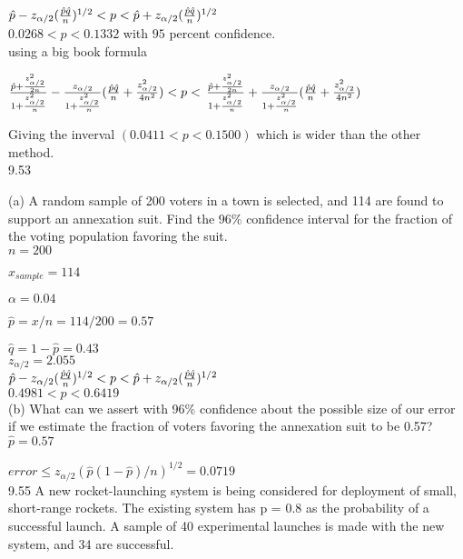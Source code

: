 $\hat{p} - z_{\alpha/2} (\frac{ \hat{p} \hat{q} }{n})^{1/2} < p < \hat{p} + z_{\alpha/2} (\frac{ \hat{p} \hat{q} }{n})^{1/2} $ \\

$0.0268 < p < 0.1332$ with $95$ percent confidence. \\

using a big book formula

$\frac{\hat{p} + \frac{z^2_{\alpha/2}}{2n}}{1  + \frac{z^2_{\alpha/2}}{n}} - \frac{z_{\alpha/2} }{1+ \frac{z_{\alpha/2}^2}{n}}
(\frac{\hat{p}\hat{q}}{n} + \frac{z^2_{\alpha/2}}{4n^2}) <
p < $
$\frac{\hat{p} + \frac{z^2_{\alpha/2}}{2n}}{1  + \frac{z^2_{\alpha/2}}{n}} + \frac{z_{\alpha/2} }{1+ \frac{z_{\alpha/2}^2}{n}}
(\frac{\hat{p}\hat{q}}{n} + \frac{z^2_{\alpha/2}}{4n^2})$

Giving the inverval $(0.0411 < p < 0.1500)$ which is wider than the other method. \\


9.53 
 
(a) A random sample of 200 voters in a town is selected, and 114 are found to support an annexation suit. Find the 96\% confidence interval for the fraction of the voting population favoring the suit. \\

$n = 200$

$x_{sample} = 114$

$\alpha = 0.04$

$\hat{p} = x/n = 114/200 = 0.57$

$\hat{q} = 1 - \hat{p} = 0.43$ \\

$z_{\alpha/2} = 2.055$ \\

$\hat{p} - z_{\alpha/2} (\frac{\hat{p}\hat{q}}{n})^{1/2}
< p < 
\hat{p} + z_{\alpha/2} (\frac{\hat{p}\hat{q}}{n})^{1/2} $ \\

$0.4981 < p < 0.6419$ \\

(b) What can we assert with 96\% confidence about the possible size of our error if we estimate the fraction of voters favoring the annexation suit to be 0.57? \\

$\hat{p} = 0.57$

$error \leq z_{\alpha/2} (\hat{p}(1-\hat{p})/n)^{1/2}$$ = 0.0719$ \\

9.55 A new rocket-launching system is being considered for deployment of small, short-range rockets. The existing system has p = 0.8 as the probability of a successful launch. A sample of 40 experimental launches is made with the new system, and 34 are successful. \\

